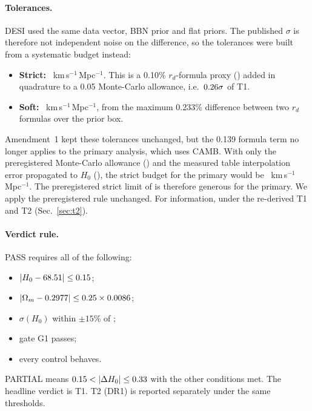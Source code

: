 \documentclass[11pt]{article}
\begin{document}
\paragraph{Tolerances.}
DESI used the same data vector, BBN prior and flat priors. The published
$\sigma$ is therefore not independent noise on the difference, so the
tolerances were built from a systematic budget instead:
\begin{itemize}
\item \textbf{Strict:} \TolStrict{}~km\,s$^{-1}$\,Mpc$^{-1}$. This is a
  0.10\% $r_d$-formula proxy (\SysStrict) added in quadrature to a 0.05
  Monte-Carlo allowance, i.e.\ $0.26\sigma$ of T1.
\item \textbf{Soft:} \TolSoft{}~km\,s$^{-1}$\,Mpc$^{-1}$, from the maximum
  0.233\% difference between two $r_d$ formulas over the prior box.
\end{itemize}
Amendment~1 kept these tolerances unchanged, but the 0.139 formula term
no longer applies to the primary analysis, which uses CAMB. With only the
preregistered Monte-Carlo allowance (\RebMc) and the measured table
interpolation error propagated to $H_0$ (\RebInterp), the strict budget
for the primary would be \RebStrict~km\,s$^{-1}$\,Mpc$^{-1}$. The
preregistered strict limit of \TolStrict{} is therefore generous for the
primary. We apply the preregistered rule unchanged. For information, under
the re-derived \RebStrict{} T1 \RebTOne{} and T2 \RebTTwo{}
(Sec.~\ref{sec:t2}).

\paragraph{Verdict rule.}
PASS requires all of the following:
\begin{itemize}
\item $|H_0-68.51|\le0.15$;
\item $|\Omega_m-0.2977|\le0.25\times0.0086$;
\item $\sigma(H_0)$ within $\pm15\%$ of \TgTOneHErr;
\item gate G1 passes;
\item every control behaves.
\end{itemize}
PARTIAL means $\TolStrict<|\Delta H_0|\le\TolSoft$ with the other
conditions met. The headline verdict is T1. T2 (DR1) is reported
separately under the same thresholds.
\end{document}
